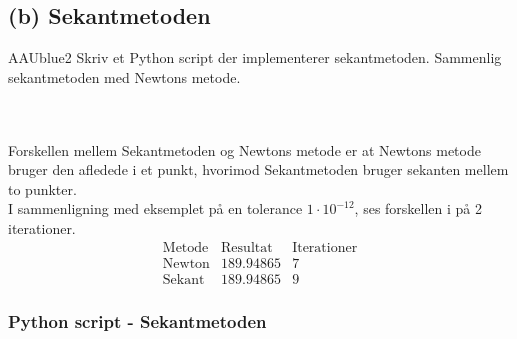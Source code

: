 \subsection*{(b) Sekantmetoden}
%
\begin{color}{AAUblue2}
Skriv et Python script der implementerer sekantmetoden. 
Sammenlig sekantmetoden med Newtons metode.
\end{color}
\\\\
%
%
Forskellen mellem Sekantmetoden og Newtons metode er at Newtons metode bruger den afledede i et punkt, hvorimod Sekantmetoden bruger sekanten mellem to punkter. \\
I sammenligning med eksemplet på en tolerance $1\cdot10^{-12}$, ses forskellen i på 2 iterationer. 
%
$$\begin{array}{l|c|c}
\text{Metode} & \text{Resultat} & \text{Iterationer}\\
\hline
\text{Newton}		& 189.94865 & 7\\
\text{Sekant}		& 189.94865 & 9
\end{array}$$
%
\subsubsection*{Python script - Sekantmetoden}
%

\phantom{matematik}